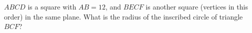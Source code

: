 $ABCD$ is a square with $AB=12$, and $BECF$ is another square (vertices in this order) in the same plane. What is the radius of the inscribed circle of triangle $BCF$?
